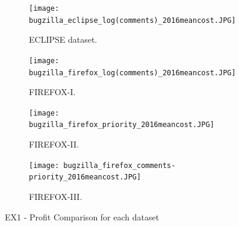 
\begin{figure}[h]
\begin{subfigure}{\columnwidth}
\texttt{[image: bugzilla\_eclipse\_log(comments)\_2016meancost.JPG]}
\caption{ECLIPSE dataset. }
\end{subfigure}
\begin{subfigure}{\columnwidth}
\texttt{[image: bugzilla\_firefox\_log(comments)\_2016meancost.JPG]}
\caption{FIREFOX-I. }
\end{subfigure}
\begin{subfigure}{\columnwidth}
\texttt{[image: bugzilla\_firefox\_priority\_2016meancost.JPG]}
\caption{FIREFOX-II. }
\end{subfigure}
\begin{subfigure}{\columnwidth}
\texttt{[image: bugzilla\_firefox\_comments-priority\_2016meancost.JPG]}
\caption{FIREFOX-III. }
\end{subfigure}

\caption{EX1 - Profit Comparison for each dataset}
\label{fig:DatasetProfit}
\end{figure}


